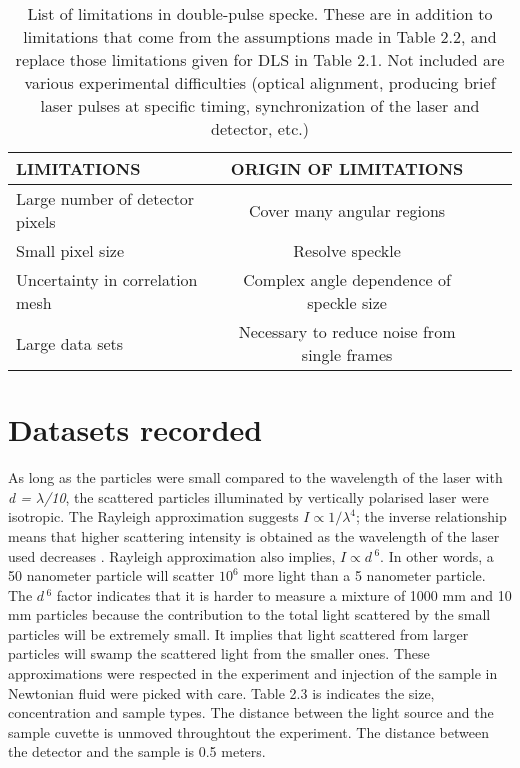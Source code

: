 \begin{table}
\begin{center}
\begin{tabular}{|l|c|c|c|}
\hline
{\sc \textbf{LIMITATIONS}}  &  {\sc \textbf{ORIGIN OF LIMITATIONS}} \\
\hline
Large number of detector pixels  & Cover many angular regions\\
\hline
Small pixel size  & Resolve speckle \\
\hline
Uncertainty in correlation mesh & Complex angle dependence of speckle size \\
\hline
Large data sets  & Necessary to reduce noise from single frames \\
\hline
\end{tabular}
\end{center}
\caption[List of limitations in double-pulse speckle.] {List of limitations in double-pulse specke.  These are in addition to limitations that come from the assumptions made in Table 2.2, and replace those limitations given for DLS in Table 2.1.  Not included are various experimental difficulties (optical alignment, producing brief laser pulses at specific timing, synchronization of the laser and detector, etc.) }
\label{table_genomes}
\end{table}

\section{Datasets recorded}

As long as the particles were small compared to the wavelength of the laser with {\it d = $\lambda$/10}, the scattered particles illuminated by vertically polarised laser were isotropic. The Rayleigh approximation suggests $I \propto 1/\lambda^4$; the inverse relationship means that higher scattering intensity is obtained as the wavelength of the laser used decreases \citep{Reif}. Rayleigh approximation also implies, $I \propto d\,^6$. In other words, a 50 nanometer particle will scatter $10^6$ more light than a 5 nanometer particle. The $d\, ^6$ factor indicates that it is harder to measure a mixture of 1000 mm and 10 mm particles because the contribution to the total light scattered by the small particles will be extremely small. It implies that light scattered from larger particles will swamp the scattered light from the smaller ones. These approximations were respected in the experiment and injection of the sample in Newtonian fluid were picked with care. Table 2.3 is indicates the size, concentration and sample types. The distance between the light source and the sample cuvette is unmoved throughtout the experiment. The distance between the detector and the sample is 0.5 meters.\\

